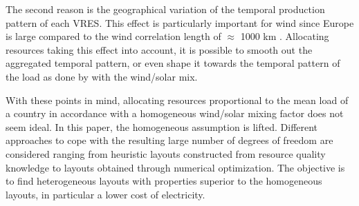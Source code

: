 \documentclass[a4paper, 5p, sort&compress]{elsarticle}%
\begin{document}



The second reason is the geographical variation of the temporal
production pattern of each VRES. This effect is particularly important
for wind since Europe is large compared to the wind correlation length
of $\approx$ 1000 km \cite{Widen2011}. Allocating resources taking
this effect into account, it is possible to smooth out the aggregated
temporal pattern, or even shape it towards the temporal pattern of the
load as done by \cite{Heide2010,Heide2011} with the wind/solar mix.

With these points in mind, allocating resources proportional to the
mean load of a country in accordance with a homogeneous wind/solar
mixing factor does not seem ideal. In this paper, the homogeneous
assumption is lifted. Different approaches to cope with the resulting
large number of degrees of freedom are considered ranging from
heuristic layouts constructed from resource quality knowledge to
layouts obtained through numerical optimization. The objective is to
find heterogeneous layouts with properties superior to the homogeneous
layouts, in particular a lower cost of electricity.



\end{document}
